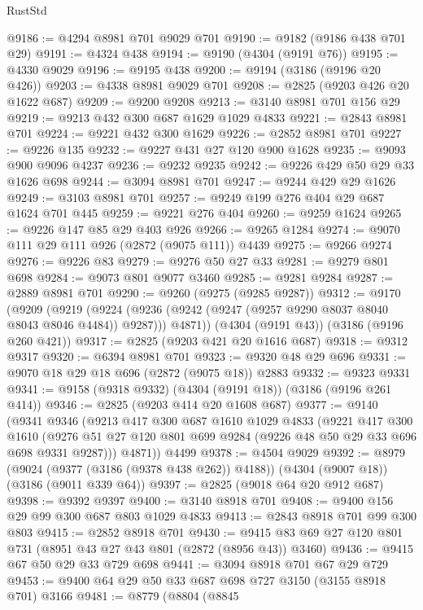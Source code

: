 \begin{lexlean}{RustStd}
\begin{coremodule}
{\begin{coremodule}
{{{{{{{{{{{{{{{{{{{{@9186 := @4294 @8981 @701 @9029 @701
@9190 := @9182 (@9186 @438 @701 @29)
@9191 := @4324 @438
@9194 := @9190 (@4304 (@9191 @76))
@9195 := @4330 @9029
@9196 := @9195 @438
@9200 := @9194 (@3186 (@9196 @20 @426))
@9203 := @4338 @8981 @9029 @701
@9208 := @2825 (@9203 @426 @20 @1622 @687)
@9209 := @9200 @9208
@9213 := @3140 @8981 @701 @156 @29
@9219 := @9213 @432 @300 @687 @1629 @1029 @4833
@9221 := @2843 @8981 @701
@9224 := @9221 @432 @300 @1629
@9226 := @2852 @8981 @701
@9227 := @9226 @135
@9232 := @9227 @431 @27 @120 @900 @1628
@9235 := @9093 @900 @9096 @4237
@9236 := @9232 @9235
@9242 := @9226 @429 @50 @29 @33 @1626 @698
@9244 := @3094 @8981 @701
@9247 := @9244 @429 @29 @1626
@9249 := @3103 @8981 @701
@9257 := @9249 @199 @276 @404 @29 @687 @1624 @701 @445
@9259 := @9221 @276 @404
@9260 := @9259 @1624
@9265 := @9226 @147 @85 @29 @403 @926
@9266 := @9265 @1284
@9274 := @9070 @111 @29 @111 @926 (@2872 (@9075 @111)) @4439
@9275 := @9266 @9274
@9276 := @9226 @83
@9279 := @9276 @50 @27 @33
@9281 := @9279 @801 @698
@9284 := @9073 @801 @9077 @3460
@9285 := @9281 @9284
@9287 := @2889 @8981 @701
@9290 := @9260 (@9275 (@9285 @9287))
@9312 := @9170
    (@9209
      (@9219
        (@9224 (@9236 (@9242 (@9247 (@9257 @9290 @8037 @8040 @8043 @8046 @4484)) @9287)))
        @4871))
    (@4304 (@9191 @43))
    (@3186 (@9196 @260 @421))
@9317 := @2825 (@9203 @421 @20 @1616 @687)
@9318 := @9312 @9317
@9320 := @6394 @8981 @701
@9323 := @9320 @48 @29 @696
@9331 := @9070 @18 @29 @18 @696 (@2872 (@9075 @18)) @2883
@9332 := @9323 @9331
@9341 := @9158 (@9318 @9332) (@4304 (@9191 @18)) (@3186 (@9196 @261 @414))
@9346 := @2825 (@9203 @414 @20 @1608 @687)
@9377 := @9140
    (@9341
      @9346
      (@9213
        @417
        @300
        @687
        @1610
        @1029
        @4833
        (@9221
          @417
          @300
          @1610
          (@9276 @51 @27 @120 @801 @699 @9284 (@9226 @48 @50 @29 @33 @696 @698 @9331 @9287)))
        @4871))
    @4499
@9378 := @4504 @9029
@9392 := @8979
    (@9024 (@9377 (@3186 (@9378 @438 @262)) @4188))
    (@4304 (@9007 @18))
    (@3186 (@9011 @339 @64))
@9397 := @2825 (@9018 @64 @20 @912 @687)
@9398 := @9392 @9397
@9400 := @3140 @8918 @701
@9408 := @9400 @156 @29 @99 @300 @687 @803 @1029 @4833
@9413 := @2843 @8918 @701 @99 @300 @803
@9415 := @2852 @8918 @701
@9430 := @9415 @83 @69 @27 @120 @801 @731 (@8951 @43 @27 @43 @801 (@2872 (@8956 @43)) @3460)
@9436 := @9415 @67 @50 @29 @33 @729 @698
@9441 := @3094 @8918 @701 @67 @29 @729
@9453 := @9400 @64 @29 @50 @33 @687 @698 @727 @3150 (@3155 @8918 @701) @3166
@9481 := @8779
    (@8804
      (@8845
}}}}}}}}}}}}}}}}}}}}
\end{coremodule}}
\end{coremodule}
\end{lexlean}
